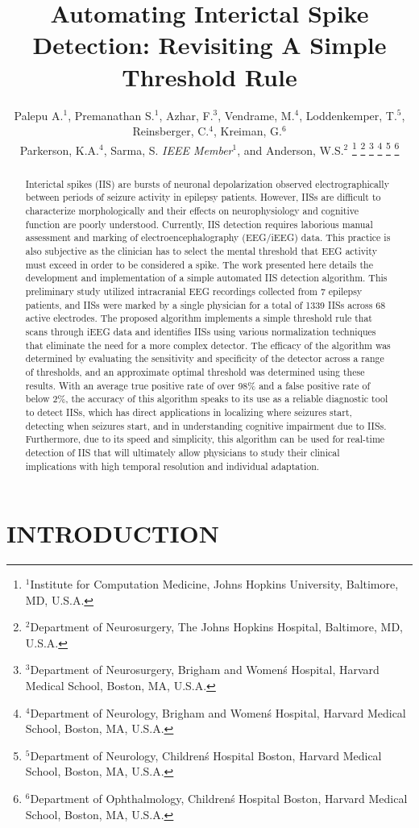 \documentclass[letterpaper, 10pt, conference]{ieeeconf}      %
\title{\LARGE \bf
Automating Interictal Spike Detection: Revisiting A Simple Threshold Rule
}
\author{Palepu A.$^{1}$, Premanathan S.$^{1}$, Azhar, F.$^{3}$, Vendrame, M.$^{4}$, Loddenkemper, T.$^{5}$, Reinsberger, C.$^{4}$,  Kreiman, G.$^{6}$  \\ 
Parkerson, K.A.$^{4}$, Sarma, S. {\it IEEE Member}$^{1}$, and Anderson, W.S.$^{2}$%
\thanks{$^{1}$Institute for Computation Medicine, Johns Hopkins University, Baltimore, MD, U.S.A.}
\thanks{$^{2}$Department of Neurosurgery, The Johns Hopkins Hospital, Baltimore, MD, U.S.A.}
\thanks{$^{3}$Department of Neurosurgery, Brigham and Women\'s Hospital, Harvard Medical
School, Boston, MA, U.S.A.}
\thanks{$^{4}$Department of Neurology, Brigham and Women\'s Hospital, Harvard Medical School,
Boston, MA, U.S.A.}
\thanks{$^{5}$Department of Neurology, Children\'s Hospital Boston, Harvard Medical School,
Boston, MA, U.S.A.}
\thanks{$^{6}$Department of Ophthalmology, Children\'s Hospital Boston, Harvard Medical School,
Boston, MA, U.S.A.}
}
\begin{document}
\maketitle
\thispagestyle{empty}
\pagestyle{empty}


\begin{abstract}

Interictal spikes (IIS) are bursts of neuronal depolarization observed electrographically between periods of seizure activity in epilepsy patients. However, IISs are difficult to characterize morphologically and their effects on neurophysiology and cognitive function are poorly understood. Currently, IIS detection requires laborious manual assessment and marking of electroencephalography (EEG/iEEG) data. This practice is also subjective as the clinician has to select the mental threshold that EEG activity must exceed in order to be considered a spike. The work presented here details the development and implementation of a simple automated IIS detection algorithm. This preliminary study utilized intracranial EEG recordings collected from 7 epilepsy patients, and IISs were marked by a single physician for a total of 1339 IISs across 68 active electrodes. The proposed algorithm implements a simple threshold rule that scans through iEEG data and identifies IISs using various normalization techniques that eliminate the need for a more complex detector. The efficacy of the algorithm was determined by evaluating the sensitivity and specificity of the detector across a range of thresholds, and an approximate optimal threshold was determined using these results. With an average true positive rate of over 98\% and a false positive rate of below 2\%, the accuracy of this algorithm speaks to its use as a reliable diagnostic tool to detect IISs, which has direct applications in localizing where seizures start, detecting when seizures start, and in understanding cognitive impairment due to IISs. Furthermore, due to its speed and simplicity, this algorithm can be used for real-time detection of IIS that will ultimately allow physicians to study their clinical implications with high temporal resolution and individual adaptation.

\end{abstract}


\section{INTRODUCTION}
\end{document}
